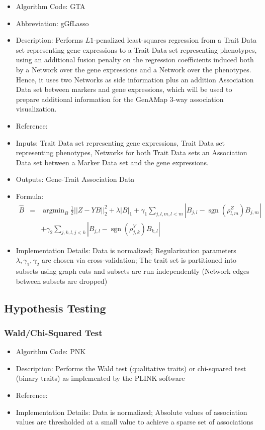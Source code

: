 \documentclass{article}
\newcommand{\sgn}{\operatorname{sgn}}
\newcommand{\argmin}{\operatorname{argmin}}
\begin{document}
\begin{itemize}
\item Algorithm Code: GTA
\item Abbreviation: gGfLasso
\item Description: Performs $L1$-penalized least-squares regression from a Trait Data set representing gene expressions to a Trait Data set representing phenotypes, using an additional fusion penalty on the regression coefficients induced both by a Network over the gene expressions and a Network over the phenotypes. Hence, it uses two Networks as side information plus an addition Association Data set between markers and gene expressions, which will be used to prepare additional information for the GenAMap 3-way association visualization.
\item Reference: \cite{gGFLasso}
\item Inputs: Trait Data set representing gene expressions, Trait Data set representing phenotypes, Networks for both Trait Data sets an Association Data set between a Marker Data set and the gene expressions.
\item Outputs: Gene-Trait Association Data
\item Formula:
\begin{eqnarray*}
\hat{B} &=& \argmin_{B} \frac{1}{2}||Z - YB||_2^2 + \lambda|B|_1 + \gamma_1\sum_{j,l,m, l < m}|B_{j,l} - \sgn(\rho^Z_{l,m})B_{j,m}| \\
&& + \gamma_2\sum_{j,k,l, j < k}|B_{j,l} - \sgn(\rho^Y_{j,k})B_{k,l}|
\end{eqnarray*}
\item Implementation Details: Data is normalized; Regularization parameters $\lambda, \gamma_1,\gamma_2$ are chosen via cross-validation; The trait set is partitioned into subsets using graph cuts and subsets are run independently (Network edges between subsets are dropped)
\end{itemize}



\subsection{Hypothesis Testing}

\subsubsection{Wald/Chi-Squared Test}
\begin{itemize}
\item Algorithm Code: PNK
\item Description: Performs the Wald test (qualitative traits) or chi-squared test (binary traits) as implemented by the PLINK software
\item Reference: \cite{PLINK}
\item Implementation Details: Data is normalized; Absolute values of association values are thresholded at a small value to achieve a sparse set of associations
\end{itemize}
\end{document}
